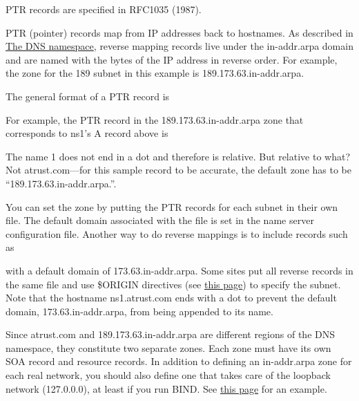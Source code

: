 \leavevmode\hypertarget{part0024_split_026.htmlux5cux23_idContainer947}{}%
\protect\hypertarget{part0024_split_026.htmlux5cux23_idTextAnchor880}{}{}PTR
records are specified in RFC1035 (1987).

PTR (pointer) records
\protect\hypertarget{part0024_split_026.htmlux5cux23_idIndexMarker2082}{}{}map
from IP addresses back to hostnames. As described in
\protect\hyperlink{part0024_split_007.htmlux5cux23_idTextAnchor849}{{The
DNS namespace}},
\protect\hypertarget{part0024_split_026.htmlux5cux23_idIndexMarker2083}{}{}reverse
mapping records live under the in-addr.arpa domain and are named with
the bytes of the IP address in reverse order.
\protect\hypertarget{part0024_split_026.htmlux5cux23_idIndexMarker2084}{}{}For
example, the zone for the 189 subnet in this example is
189.173.63.in-addr.arpa.

The general format of a PTR record is


For example, the PTR record in the
189.173.63.\protect\hypertarget{part0024_split_026.htmlux5cux23_idIndexMarker2085}{}{}\protect\hypertarget{part0024_split_026.htmlux5cux23_idIndexMarker2086}{}{}in-addr.arpa
zone that corresponds to ns1's A record above is


The name 1 does not end in a dot and therefore is relative. But relative
to what? Not atrust.com---for this sample record to be accurate, the
default zone has to be ``189.173.63.in-addr.arpa.''.

\protect\hypertarget{part0024_split_026.htmlux5cux23_idIndexMarker2087}{}{}You
can set the zone by putting the PTR records for each subnet in their own
file. The default domain associated with the file is set in the name
server configuration file. Another way to do reverse mappings is to
include records such as


with a default domain of 173.63.in-addr.arpa. Some sites put all reverse
records in the same file and use {\$ORIGIN} directives (see
\protect\hyperlink{part0024_split_020.htmlux5cux23_idTextAnchor867}{this
page}) to specify the subnet. Note that the hostname ns1.atrust.com ends
with a dot to prevent the default domain, 173.63.in-addr.arpa, from
being appended to its name.

Since atrust.com and 189.173.63.in-addr.arpa are different regions of
the DNS namespace, they constitute two separate zones. Each zone must
have its own SOA record and resource records. In addition to defining an
in-addr.arpa zone for each real network, you should also define one that
takes care of the loopback network (127.0.0.0), at least if you run
BIND. See
\protect\hyperlink{part0024_split_048.htmlux5cux23_idTextAnchor924}{this
page} for an example.

